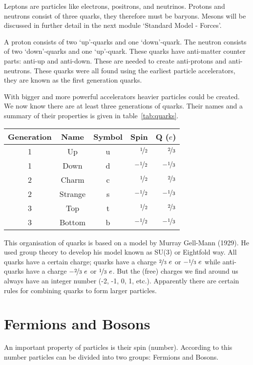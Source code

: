 Leptons are particles like electrons, positrons, and neutrinos. Protons and neutrons consist of three quarks, they therefore must be baryons. Mesons will be discussed in further detail in the next module `Standard Model - Forces'.

A proton consists of two `up'-quarks and one `down'-quark. The neutron consists of two `down'-quarks and one `up'-quark. These quarks have anti-matter counter parts: anti-up and anti-down. These are needed to create anti-protons and anti-neutrons. These quarks were all found using the earliest particle accelerators, they are known as the first generation quarks. 

With bigger and more powerful accelerators heavier particles could be created. We now know there are at least three generations of quarks. Their names and a summary of their properties is given in table~\ref{tab:quarks}.

\begin{center}\begin{tabular}[h]{c c c r r} 
Generation & Name & Symbol & Spin & Q ($e$) \\ \hline
1 & Up & u & $\nicefrac{1}{2}$ & $\nicefrac{2}{3}$ \\
1 & Down & d & $-\nicefrac{1}{2}$ & $-\nicefrac{1}{3}$ \\
2 & Charm & c & $\nicefrac{1}{2}$ & $\nicefrac{2}{3}$ \\
2 & Strange & s & $-\nicefrac{1}{2}$ & $-\nicefrac{1}{3}$ \\
3 & Top & t & $\nicefrac{1}{2}$ & $\nicefrac{2}{3}$ \\
3 & Bottom & b & $-\nicefrac{1}{2}$ & $-\nicefrac{1}{3}$
\end{tabular}
\label{tab:quarks}
\end{center}

This organisation of quarks is based on a model by Murray Gell-Mann (1929). He used group theory to develop his model known as SU(3) or Eightfold way. All quarks have a certain charge; quarks have a charge $\nicefrac{2}{3}~e$ or $-\nicefrac{1}{3}~e$ while anti-quarks have a charge $-\nicefrac{2}{3}~e$ or $\nicefrac{1}{3}~e$. But the (free) charges we find around us always have an integer number (-2, -1, 0, 1, etc.). Apparently there are certain rules for combining quarks to form larger particles.

\section{Fermions and Bosons}
An important property of particles is their spin (number). According to this number particles can be divided into two groups: Fermions and Bosons.
